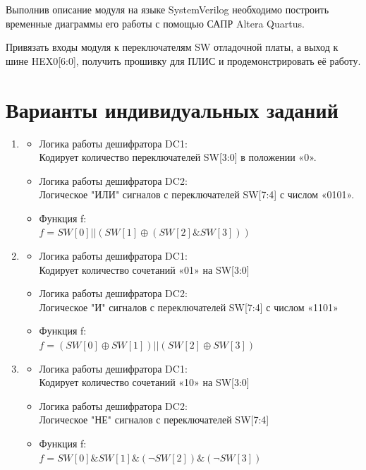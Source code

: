 \par{Выполнив описание модуля на языке SystemVerilog необходимо построить временные диаграммы его работы с помощью САПР Altera Quartus.}
\par{Привязать входы модуля к переключателям SW отладочной платы, а выход к шине HEX0[6:0], получить прошивку для ПЛИС и продемонстрировать её работу.}


\section{Варианты индивидуальных заданий}


\begin{enumerate}
  
  \setlength\itemsep{1em}

  \item{
    \begin{itemize}
    \item Логика работы дешифратора DC1: \\
      Кодирует количество переключателей SW[3:0] в положении «0».
    \item Логика работы дешифратора DC2: \\ 
      Логическое "ИЛИ" сигналов с переключателей SW[7:4] с числом «0101».
    \item Функция f:\\
      $f = SW[0] || (SW[1] \oplus (SW[2] \& SW[3]))$
    \end{itemize}
  }

  \item{
    \begin{itemize}
    \item Логика работы дешифратора DC1: \\
      Кодирует количество сочетаний «01» на SW[3:0]
    \item Логика работы дешифратора DC2: \\ 
      Логическое "И" сигналов с переключателей SW[7:4] с числом «1101»
    \item Функция f:\\
      $f = (SW[0] \oplus  SW[1]) || (SW[2] \oplus  SW[3])$
    \end{itemize}
  }

    \item{
    \begin{itemize}
    \item Логика работы дешифратора DC1: \\
      Кодирует количество сочетаний «10» на SW[3:0]
    \item Логика работы дешифратора DC2: \\ 
      Логическое "НЕ" сигналов с переключателей SW[7:4]
    \item Функция f:\\
      $f = SW[0] \& SW[1] \& (\neg SW[2]) \& (\neg SW[3])$
    \end{itemize}
  }


\end{enumerate}
